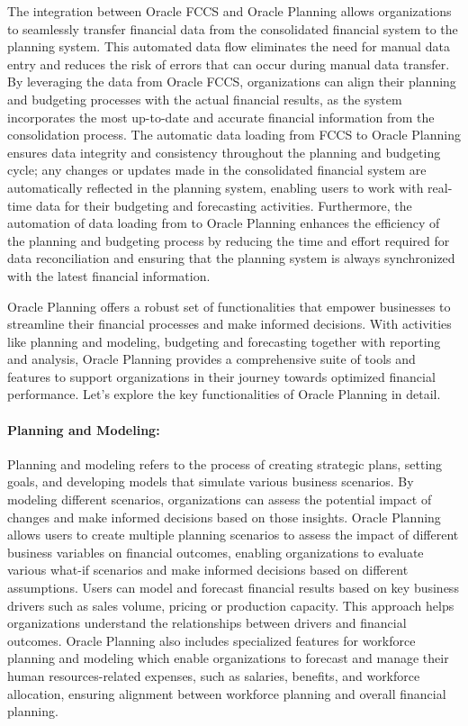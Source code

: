 \documentclass[12pt,a4paper,openright,twoside]{book}
\begin{document}
The integration between Oracle FCCS and Oracle Planning allows organizations to seamlessly transfer financial data from the consolidated financial system to the planning system. 
%
This automated data flow eliminates the need for manual data entry and reduces the risk of errors that can occur during manual data transfer.
%
By leveraging the data from Oracle FCCS, organizations can align their planning and budgeting processes with the actual financial results, as the system incorporates the most up-to-date and accurate financial information from the consolidation process.
%
The automatic data loading from FCCS to Oracle Planning ensures data integrity and consistency throughout the planning and budgeting cycle; any changes or updates made in the consolidated financial system are automatically reflected in the planning system, enabling users to work with real-time data for their budgeting and forecasting activities.
%
Furthermore, the automation of data loading from to Oracle Planning enhances the efficiency of the planning and budgeting process by reducing the time and effort required for data reconciliation and ensuring that the planning system is always synchronized with the latest financial information. 

Oracle Planning offers a robust set of functionalities that empower businesses to streamline their financial processes and make informed decisions. 
%
With activities like planning and modeling, budgeting and forecasting together with reporting and analysis, Oracle Planning provides a comprehensive suite of tools and features to support organizations in their journey towards optimized financial performance. 
%
 Let's explore the key functionalities of Oracle Planning in detail.

\paragraph{Planning and Modeling:} 

Planning and modeling refers to the process of creating strategic plans, setting goals, and developing models that simulate various business scenarios.
%
By modeling different scenarios, organizations can assess the potential impact of changes and make informed decisions based on those insights.
%
Oracle Planning allows users to create multiple planning scenarios to assess the impact of different business variables on financial outcomes, enabling organizations to evaluate various what-if scenarios and make informed decisions based on different assumptions.
%
Users can model and forecast financial results based on key business drivers such as sales volume, pricing or production capacity.
%
This approach helps organizations understand the relationships between drivers and financial outcomes.
%
Oracle Planning also includes specialized features for workforce planning and modeling which enable organizations to forecast and manage their human resources-related expenses, such as salaries, benefits, and workforce allocation, ensuring alignment between workforce planning and overall financial planning.
\end{document}
